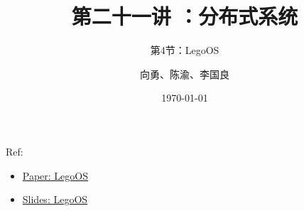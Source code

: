 


\title[第21讲]{第二十一讲 ：分布式系统} %
\subtitle{第4节：LegoOS}
\author{向勇、陈渝、李国良} %
\date{\today} %


    
\begin{frame}
    \titlepage %

    
    Ref:
        \begin{itemize}
            \item \href{https://www.usenix.org/system/files/osdi18-shan.pdf}{Paper: LegoOS} %
            \item \href{https://www.usenix.org/sites/default/files/conference/protected-files/osdi18_slides_shan.pdf}{Slides: LegoOS} %
        \end{itemize}
    
\end{frame}
